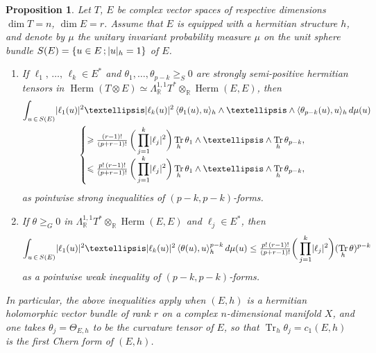 \documentclass[10pt,a4paper]{amsart}
\numberwithin{equation}{section}
\DeclareMathOperator{\Herm}{Herm}
\DeclareMathOperator{\Tr}{Tr}
\DeclarePairedDelimiter{\abs}{\lvert}{\rvert}
\newcommand*\bR{\mathbb{R}}
\let\leq\leqslant
\let\geq\geqslant
\newcommand*{\alphenumi}{\renewcommand*{\theenumi}{\alph{enumi}}}
\newtheorem{prop}[theo]{Proposition}
\theoremstyle{definition}\newtheorem{defi}[theo]{Definition}
\theoremstyle{remark}\newtheorem{rema}[theo]{Remark}
\begin{document}
\setcounter{theo}{6}
\begin{prop}\label{prop:Chern_curv_inequalities}
Let $T$, $E$ be complex vector spaces of respective dimensions $\dim T=n$, $\dim E=r$. Assume that $E$ is equipped with a hermitian structure $h$, and denote by $\mu$ the unitary invariant probability measure $\mu$ on the unit sphere bundle $S(E)=\{u\in E\,;\abs{u}_h=1\}$ of $E$.
\begin{enumerate}\alphenumi
\item\label{item:Chern_curv_inequality1}
If $\ell_1,\,\dotsc,\,\ell_k\in E^*$ and $\theta_1,\dotsc,\theta_{p-k}\geq_S 0$ are strongly semi-positive hermitian tensors in
$\Herm(T\otimes E)\simeq\Lambda_\bR^{1,1}T^*\otimes_\bR\Herm(E,E)$, then
\begin{multline*}
\int_{u\,\in\,S(E)}\abs{\ell_1(u)}^2\ldots\abs{\ell_k(u)}^2\,
\langle\theta_1(u),u\rangle_h\wedge\ldots
\wedge\langle\theta_{p-k}(u),u\rangle_h\,d\mu(u)
\\
\begin{cases}
\displaystyle
\geq \tfrac{(r-1)!}{ (p+r-1)!}\,\bigg(\prod_{j=1}^k\abs{\ell_j}^2\bigg)
\Tr_h\theta_1\wedge\ldots\wedge\Tr_h\theta_{p-k},\\
\displaystyle
\leq \tfrac{p!\,(r-1)!}{ (p+r-1)!}\,\bigg(\prod_{j=1}^k\abs{\ell_j}^2\bigg)
\Tr_h\theta_1\wedge\ldots\wedge\Tr_h\theta_{p-k},
\end{cases}
\end{multline*}
as pointwise strong inequalities of $(p-k,p-k)$-forms.
\item\label{item:Chern_curv_inequality2}
If $\theta\geq_G 0$ in $\Lambda_\bR^{1,1}T^*\otimes_\bR\Herm(E,E)$ and $\ell_j\in E^*$, then
\[
\int_{u\,\in\,S(E)}\abs{\ell_1(u)}^2\ldots\abs{\ell_k(u)}^2\,
\langle\theta(u),u\rangle_h^{p-k}\,d\mu(u)\le
\tfrac{p!\,(r-1)!}{ (p+r-1)!}\bigg(\prod_{j=1}^k\abs{\ell_j}^2\bigg)(\Tr_h\theta)^{p-k}
\]
as a pointwise weak inequality of $(p-k,p-k)$-forms.
\end{enumerate}
In particular, the above inequalities apply when
$(E,h)$ is a hermitian holomorphic vector bundle of rank $r$ on a complex $n$-dimensional manifold $X$, and one takes
$\theta_j=\Theta_{E,h}$ to be the curvature tensor of $E$, so that
$\Tr_h\theta_j=c_1(E,h)$ is the first Chern form of $(E,h)$.
\end{prop}
\end{document}
